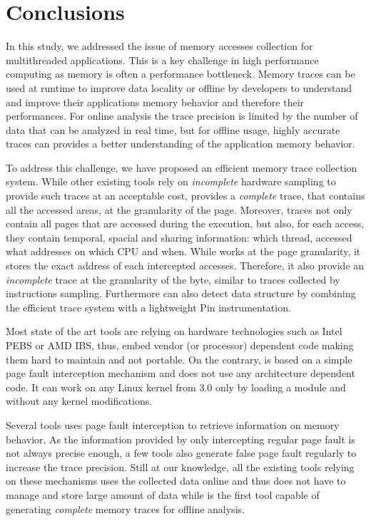 \section{Conclusions}
\label{sec:cncl}

In this study, we addressed the issue of memory accesses collection for
multithreaded applications. This is a key challenge in high performance
computing as memory is often a performance
bottleneck. Memory traces can be used at runtime to improve data locality or
offline by developers to understand and improve their applications memory
behavior and therefore their performances. For online analysis the trace precision
is limited by the number of data that can be analyzed in real time, but for
offline usage, highly accurate traces can provides a better understanding of
the application memory behavior.

To address this challenge, we have proposed \Moca an efficient memory trace
collection system. While other existing tools
rely on \emph{incomplete} hardware sampling to
provide such traces at an acceptable cost, \Moca provides a \emph{complete}
trace, that contains all the accessed areas, at the granularity of the page.
Moreover, \Moca traces not only
contain all pages that are accessed during the execution, but also, 
for each access, they contain temporal, spacial and sharing
information: which thread, accessed what addresses on which CPU and when.
While \Moca works at the page granularity, it stores the exact
address of each intercepted accesses. Therefore, it also provide an
\emph{incomplete} trace at the granularity of the byte, similar to
traces collected by instructions sampling. Furthermore \Moca can also detect
data structure by combining the efficient trace system with a lightweight Pin
instrumentation.

Most state of the art tools are relying on hardware technologies such as Intel PEBS
or AMD IBS, thus, embed vendor (or processor) dependent code making them hard
to maintain and not portable. On the contrary, \Moca is based on a simple page
fault interception mechanism and does not use any architecture dependent code.
It can work on any Linux kernel from $3.0$ only by loading a module and
without any kernel modifications.

Several tools uses page fault interception to retrieve information on memory
behavior. As the information provided by only intercepting regular page fault
is not always precise enough, a few tools also generate false page fault
regularly to increase the trace precision. Still at our knowledge, all the
existing tools relying on these mechanisms uses the collected data online and
thus does not have to manage and store large amount of data while \Moca is the
first tool capable of generating \emph{complete} memory traces for offline
analysis.


